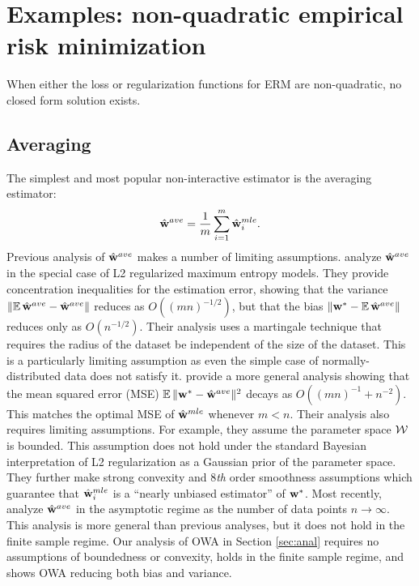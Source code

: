 \documentclass[thesis.tex]{subfiles}
\begin{document}

\section{Examples: non-quadratic empirical risk minimization}

When either the loss or regularization functions for ERM are non-quadratic,
no closed form solution exists.


\subsection{Averaging}
\label{sec:merge:ave}

The simplest and most popular non-interactive estimator is the averaging estimator:
\begin{equation}
\hat{\mathbf w}^{ave} = \frac{1}{m}\sum_{i=1}^m \hat{\mathbf w}^{mle}_i
.
\end{equation}
Previous analysis of $\hat{\mathbf w}^{ave}$ makes a number of limiting assumptions.
\citet{mcdonald2009efficient} analyze $\hat{\mathbf w}^{ave}$ in the special case of L2 regularized maximum entropy models.
They provide concentration inequalities for the estimation error,
showing that the variance ${\lVert {\operatorname*{\mathbb E}\hat{\mathbf w}^{ave}-\hat{\mathbf w}^{ave}} \rVert}$ reduces as $O((mn)^{-1/2})$,
but that the bias ${\lVert {{\mathbf w^{*}}-\operatorname*{\mathbb E}\hat{\mathbf w}^{ave}} \rVert}$ reduces only as $O(n^{-1/2})$.
Their analysis uses a martingale technique that requires the radius of the dataset be independent of the size of the dataset.
This is a particularly limiting assumption as even the simple case of
normally-distributed data does not satisfy it.
\citet{zhang2012communication} provide a more general analysis showing that the mean squared error (MSE) $\operatorname*{\mathbb E}{\lVert {{\mathbf w^{*}}-\hat{\mathbf w}^{ave}} \rVert}{}^2$ decays as $O((mn)^{-1} + n^{-2})$.
This matches the optimal MSE of $\hat{\mathbf w}^{mle}$ whenever $m<n$.
Their analysis also requires limiting assumptions.
For example, they assume the parameter space ${\mathcal W}$ is bounded.
This assumption does not hold under the standard Bayesian interpretation of L2 regularization as a Gaussian prior of the parameter space.
They further make strong convexity and 8\emph{th} order smoothness assumptions which guarantee that $\hat{\mathbf w}^{mle}_i$ is a ``nearly unbiased estimator'' of ${\mathbf w^{*}}$.
Most recently, \citet{rosenblatt2016optimality} analyze $\hat{\mathbf w}^{ave}$ in the asymptotic regime as the number of data points $n\to\infty$.
This analysis is more general than previous analyses, but it does not hold in the finite sample regime.
Our analysis of OWA in Section \ref{sec:anal} requires no assumptions of boundedness or convexity, holds in the finite sample regime, and shows OWA reducing both bias and variance.
\end{document}
